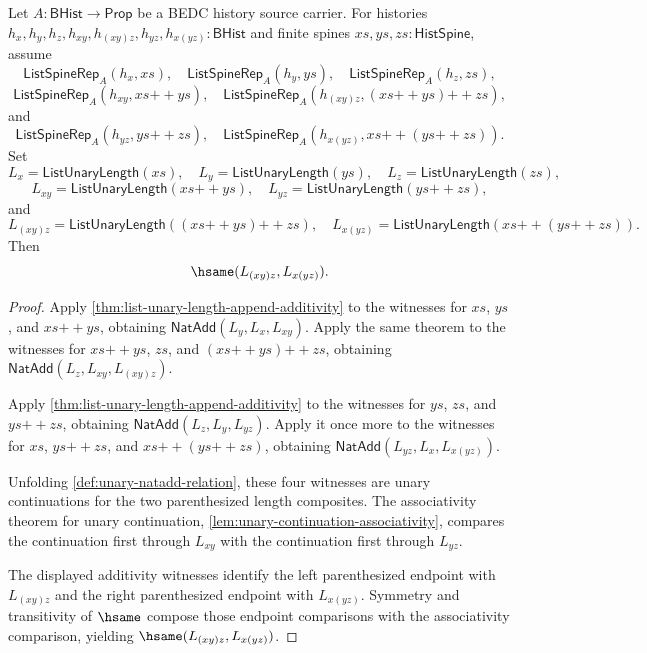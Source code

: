 \begin{theorem}
\label{thm:list-unary-length-append-associativity}
Let $A:\mathsf{BHist}\to\mathsf{Prop}$ be a BEDC history source carrier. For histories
$h_x,h_y,h_z,h_{xy},h_{(xy)z},h_{yz},h_{x(yz)}:\mathsf{BHist}$ and finite spines
$xs,ys,zs:\mathsf{HistSpine}$, assume
$$
\mathsf{ListSpineRep}_A(h_x,xs),\quad
\mathsf{ListSpineRep}_A(h_y,ys),\quad
\mathsf{ListSpineRep}_A(h_z,zs),
$$
$$
\mathsf{ListSpineRep}_A(h_{xy},xs{++}ys),\quad
\mathsf{ListSpineRep}_A(h_{(xy)z},(xs{++}ys){++}zs),
$$
and
$$
\mathsf{ListSpineRep}_A(h_{yz},ys{++}zs),\quad
\mathsf{ListSpineRep}_A(h_{x(yz)},xs{++}(ys{++}zs)).
$$
Set
$$
L_x=\mathsf{ListUnaryLength}(xs),\quad
L_y=\mathsf{ListUnaryLength}(ys),\quad
L_z=\mathsf{ListUnaryLength}(zs),
$$
$$
L_{xy}=\mathsf{ListUnaryLength}(xs{++}ys),\quad
L_{yz}=\mathsf{ListUnaryLength}(ys{++}zs),
$$
and
$$
L_{(xy)z}=\mathsf{ListUnaryLength}((xs{++}ys){++}zs),\quad
L_{x(yz)}=\mathsf{ListUnaryLength}(xs{++}(ys{++}zs)).
$$
Then
$$
\hsame(L_{(xy)z},L_{x(yz)}).
$$
\end{theorem}
\begin{proof}
Apply \autoref{thm:list-unary-length-append-additivity} to the witnesses for $xs$, $ys$, and $xs{++}ys$, obtaining
$\mathsf{NatAdd}(L_y,L_x,L_{xy})$. Apply the same theorem to the witnesses for $xs{++}ys$, $zs$, and $(xs{++}ys){++}zs$, obtaining
$\mathsf{NatAdd}(L_z,L_{xy},L_{(xy)z})$.

Apply \autoref{thm:list-unary-length-append-additivity} to the witnesses for $ys$, $zs$, and $ys{++}zs$, obtaining
$\mathsf{NatAdd}(L_z,L_y,L_{yz})$. Apply it once more to the witnesses for $xs$, $ys{++}zs$, and $xs{++}(ys{++}zs)$, obtaining
$\mathsf{NatAdd}(L_{yz},L_x,L_{x(yz)})$.

Unfolding \autoref{def:unary-natadd-relation}, these four witnesses are unary continuations for the two parenthesized length composites. The associativity theorem for unary continuation, \autoref{lem:unary-continuation-associativity}, compares the continuation first through $L_{xy}$ with the continuation first through $L_{yz}$.

The displayed additivity witnesses identify the left parenthesized endpoint with $L_{(xy)z}$ and the right parenthesized endpoint with $L_{x(yz)}$. Symmetry and transitivity of $\hsame$ compose those endpoint comparisons with the associativity comparison, yielding $\hsame(L_{(xy)z},L_{x(yz)})$.
\end{proof}
